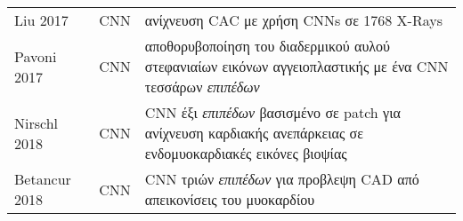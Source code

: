 \begin{sidewaystable}
\begin{tabular}{l c l}
		Liu 2017~\cite{liu2017coronary}              & CNN             & ανίχνευση CAC με χρήση CNNs σε 1768 X-Rays                                                                                                                                                                                                                                                                                                                                                  \\
		Pavoni 2017~\cite{pavoni2017image}           & CNN             & αποθορυβοποίηση του διαδερμικού αυλού στεφανιαίων εικόνων αγγειοπλαστικής με ένα CNN τεσσάρων \textit{επιπέδων}                                                                                                                                                                                                                                                                             \\
		Nirschl 2018~\cite{nirschl2018deep}          & CNN             & CNN έξι \textit{επιπέδων} βασισμένο σε patch για ανίχνευση καρδιακής ανεπάρκειας σε ενδομυοκαρδιακές εικόνες βιοψίας                                                                                                                                                                                                                                                                        \\
		Betancur 2018~\cite{betancur2018deep}        & CNN             & CNN τριών \textit{επιπέδων} για προβλεψη CAD από απεικονίσεις του μυοκαρδίου                                                                                                                                                                                                                                                                                                                \\
		\bottomrule
	\end{tabular}
\end{sidewaystable}

